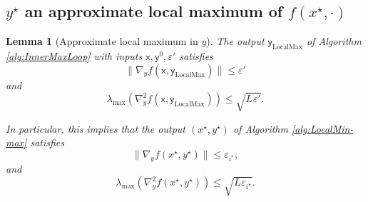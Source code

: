 \documentclass[11pt,letterpaper]{article}
\renewcommand{\epsilon}{\varepsilon}
\newtheorem{lemma}[theorem]{Lemma}
\newcommand{\ai}{i}
\begin{document}
\subsection{$y^\star$ an approximate local maximum of $f(x^\star, \cdot)$}

\begin{lemma} [{Approximate local maximum in $y$}] \label{lemma:Player2}
The output  $\mathsf{y}_{\mathrm{LocalMax}}$ of Algorithm \ref{alg:InnerMaxLoop} with inputs  $\mathsf{x}, \mathsf{y}^0, \epsilon'$ satisfies
\begin{equation}\label{eq:b1a}
\|\nabla_y f(\mathsf{x}, \mathsf{y}_{\mathrm{LocalMax}})\| \leq  \epsilon'
\end{equation}
and
\begin{equation}\label{eq:b1b}
\lambda_{\mathrm{max}}( \nabla^2_{{y}} f(\mathsf{x}, \mathsf{y}_{\mathrm{LocalMax}})) \leq \sqrt{L_{} \epsilon'}.
\end{equation}

\noindent In particular, this implies that the output $(x^\star, y^\star)$ of Algorithm \ref{alg:LocalMin-max} satisfies
\begin{equation} \label{eq:b1}
\|\nabla_y f(x^\star, y^\star)\| \leq  \epsilon_{\ai^\star},
\end{equation}
and
\begin{equation} \label{eq:b2}
\lambda_{\mathrm{max}}( \nabla^2_{{y}} f(x^\star, y^\star)) \leq \sqrt{L_{}  \epsilon_{\ai^\star}}.
\end{equation}

\end{lemma}
\end{document}
